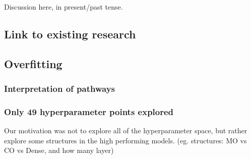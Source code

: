 Discussion here, in present/past tense.


\subsection{Link to existing research}


\subsection{Overfitting}


\subsubsection{Interpretation of pathways}

\subsubsection{Only 49 hyperparameter points explored}
    Our motivation was not to explore all of the hyperparameter space, but rather explore some structures in the high performing models. (eg. structures: MO vs CO vs Dense, and how many layer)
     \\
     \\
